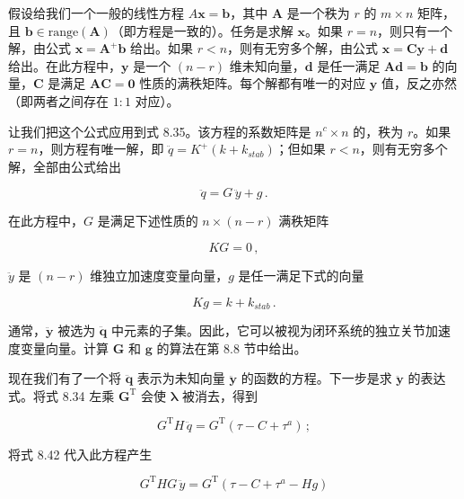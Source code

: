 \documentclass[10pt,a4paper]{book}
\theoremstyle{thmstyle} %
\theoremstyle{defstyle} %
\theoremstyle{prostyle} %
\begin{document}
假设给我们一个一般的线性方程 $A\boldsymbol{x}=\boldsymbol{b}$，其中 $\boldsymbol{A}$ 是一个秩为 $r$ 的 $m\times n$ 矩阵，且 $\boldsymbol{b}\in\text{range}(\boldsymbol{A})$（即方程是一致的）。任务是求解 $\boldsymbol{x}$。如果 $r=n$，则只有一个解，由公式 $\boldsymbol{x}=\boldsymbol{A}^{+}\boldsymbol{b}$ 给出。如果 $r<n$，则有无穷多个解，由公式 $\boldsymbol{x}=\boldsymbol{C}\boldsymbol{y}+\boldsymbol{d}$ 给出。在此方程中，$\boldsymbol{y}$ 是一个 $(n-r)$ 维未知向量，$\boldsymbol{d}$ 是任一满足 $\boldsymbol{Ad}=\boldsymbol{b}$ 的向量，$\boldsymbol{C}$ 是满足 $\boldsymbol{AC}=\boldsymbol{0}$ 性质的满秩矩阵。每个解都有唯一的对应 $\boldsymbol{y}$ 值，反之亦然（即两者之间存在 $1:1$ 对应）。



让我们把这个公式应用到式 8.35。该方程的系数矩阵是 $n^{c} \times n$ 的，秩为 $r$。如果 $r = n$，则方程有唯一解，即 $\ddot{q} = K^{+}(k + k_{stab})$；但如果 $r < n$，则有无穷多个解，全部由公式给出



$$
\ddot { q } = G \, \ddot { y } + g \, .
$$



在此方程中，$G$ 是满足下述性质的 $n \times (n - r)$ 满秩矩阵



$$
K G = 0 \, ,
$$



$\ddot{y}$ 是 $(n-r)$ 维独立加速度变量向量，$g$ 是任一满足下式的向量



$$
K g = k + k _ { s t a b } \, .
$$



通常，$\ddot{\boldsymbol{y}}$ 被选为 $\ddot{\boldsymbol{q}}$ 中元素的子集。因此，它可以被视为闭环系统的独立关节加速度变量向量。计算 $\boldsymbol{G}$ 和 $\boldsymbol{g}$ 的算法在第 8.8 节中给出。



现在我们有了一个将 $\ddot{\boldsymbol{q}}$ 表示为未知向量 $\ddot{\boldsymbol{y}}$ 的函数的方程。下一步是求 $\ddot{\boldsymbol{y}}$ 的表达式。将式 8.34 左乘 $\boldsymbol{G}^{\mathrm{T}}$ 会使 $\boldsymbol{\lambda}$ 被消去，得到



$$
G ^{\mathrm { T} } H \, \ddot { q } = G ^{\mathrm { T} } ( \tau - C + \tau ^{a} ) \, ;
$$



将式 8.42 代入此方程产生



$$
G ^{\mathrm { T} } H G \, \ddot { y } = G ^{\mathrm { T} } ( \tau - C + \tau ^{a} - H g )
$$
\end{document}
